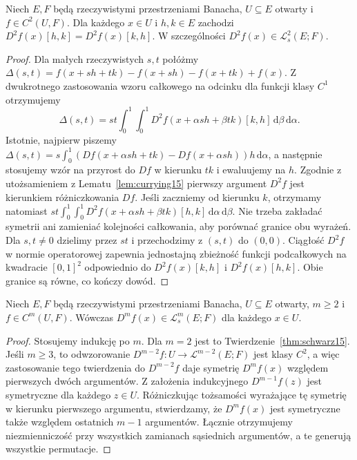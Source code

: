 \begin{twierdzenie}
\label{thm:schwarz15}
Niech $E,F$ będą rzeczywistymi przestrzeniami Banacha, $U\subseteq E$ otwarty i $f\in C^2(U,F)$. Dla każdego $x\in U$ i $h,k\in E$ zachodzi
$D^2f(x)[h,k]=D^2f(x)[k,h]$. W szczególności $D^2f(x)\in\mathcal L_s^2(E;F)$.
\end{twierdzenie}
\begin{proof}
Dla małych rzeczywistych $s,t$ połóżmy
$\Delta(s,t)=f(x+sh+tk)-f(x+sh)-f(x+tk)+f(x)$. Z dwukrotnego zastosowania wzoru całkowego na odcinku dla funkcji klasy $C^1$ otrzymujemy
\[
\Delta(s,t)=st\int_0^1\int_0^1 D^2f(x+\alpha sh+\beta tk)[k,h] \,\mathrm d\beta\,\mathrm d\alpha.
\]
Istotnie, najpierw piszemy $\Delta(s,t)=s\int_0^1(Df(x+\alpha sh+tk)-Df(x+\alpha sh))h\,\mathrm d\alpha$, a następnie stosujemy wzór na przyrost do $Df$ w kierunku $tk$ i ewaluujemy na $h$. Zgodnie z utożsamieniem z Lematu~\ref{lem:currying15} pierwszy argument $D^2f$ jest kierunkiem różniczkowania $Df$. Jeśli zaczniemy od kierunku $k$, otrzymamy natomiast $st\int_0^1\int_0^1D^2f(x+\alpha sh+\beta tk)[h,k]\,\mathrm d\alpha\,\mathrm d\beta$. Nie trzeba zakładać symetrii ani zamieniać kolejności całkowania, aby porównać granice obu wyrażeń. Dla $s,t\ne0$ dzielimy przez $st$ i przechodzimy z $(s,t)$ do $(0,0)$. Ciągłość $D^2f$ w normie operatorowej zapewnia jednostajną zbieżność funkcji podcałkowych na kwadracie $[0,1]^2$ odpowiednio do $D^2f(x)[k,h]$ i $D^2f(x)[h,k]$. Obie granice są równe, co kończy dowód.
\end{proof}


\begin{wniosek}
\label{cor:symmetric-higher15}
Niech $E,F$ będą rzeczywistymi przestrzeniami Banacha, $U\subseteq E$ otwarty, $m\ge2$ i $f\in C^m(U,F)$. Wówczas $D^mf(x)\in\mathcal L_s^m(E;F)$ dla każdego $x\in U$.
\end{wniosek}
\begin{proof}
Stosujemy indukcję po $m$. Dla $m=2$ jest to Twierdzenie~\ref{thm:schwarz15}. Jeśli $m\ge3$, to odwzorowanie $D^{m-2}f:U\to\mathcal L^{m-2}(E;F)$ jest klasy $C^2$, a więc zastosowanie tego twierdzenia do $D^{m-2}f$ daje symetrię $D^mf(x)$ względem pierwszych dwóch argumentów. Z założenia indukcyjnego $D^{m-1}f(z)$ jest symetryczne dla każdego $z\in U$. Różniczkując tożsamości wyrażające tę symetrię w kierunku pierwszego argumentu, stwierdzamy, że $D^mf(x)$ jest symetryczne także względem ostatnich $m-1$ argumentów. Łącznie otrzymujemy niezmienniczość przy wszystkich zamianach sąsiednich argumentów, a te generują wszystkie permutacje.
\end{proof}

